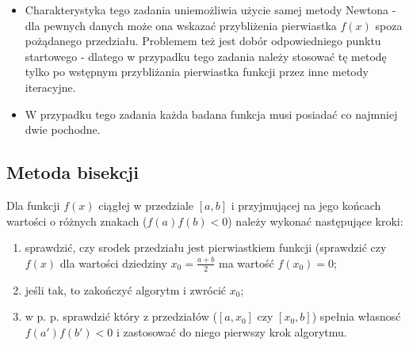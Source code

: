 \documentclass[a4paper,11pt]{article}
\begin{document}
  \begin{itemize}
    \item Charakterystyka tego zadania uniemożliwia użycie samej metody Newtona - dla pewnych danych może ona wskazać przybliżenia pierwiastka \( f(x) \) spoza pożądanego przedziału. Problemem też jest dobór odpowiedniego punktu startowego - dlatego w przypadku tego zadania należy stosować tę metodę tylko po wstępnym przybliżania pierwiastka funkcji przez inne metody iteracyjne.
    \item W przypadku tego zadania każda badana funkcja musi posiadać co najmniej dwie pochodne.
  \end{itemize}
  
  \subsection{Metoda bisekcji}
  Dla funkcji \( f(x) \) ciągłej w przedziale \( [a,b] \) i przyjmującej na jego końcach wartości o różnych znakach (\( f(a) f(b) < 0 \)) należy wykonać następujące kroki:
  \begin{enumerate}
    \item sprawdzić, czy srodek przedziału jest pierwiastkiem funkcji (sprawdzić czy \( f(x) \) dla wartości dziedziny \(x_0 = \frac {a + b} {2} \) ma wartość \(f(x_0) = 0 \);
    \item jeśli tak, to zakończyć algorytm i zwrócić \(x_0\);
    \item w p. p. sprawdzić który z przedziałów (\( [a, x_0] \) czy \( [x_0, b] \)) spełnia własnosć \( f(a')f(b') < 0 \) i zastosować do niego pierwszy krok algorytmu.
  \end{enumerate}
  
\end{document}
